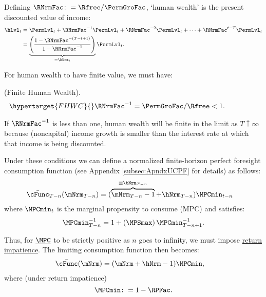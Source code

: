 \documentclass[BufferStockTheory]{subfiles}
\begin{document}
Defining $\RNrmFac \colon = \Rfree/\PermGroFac$, `human wealth' is the present discounted value of income:
%
% 
\begin{align}
  \hLvl_{t}  & = \PermLvl_{t}+\RNrmFac^{-1} \PermLvl_{t} + \RNrmFac^{-2} \PermLvl_{t} + \cdots + \RNrmFac^{t-T} \PermLvl_{t} \notag
  \\  & = \underbrace{\left(\frac{1-\RNrmFac^{-(T-t+1)}}{1-\RNrmFac^{-1}}\right)}_{\equiv \hNrm_{t}}\PermLvl_{t} \label{eq:HDef}.
\end{align}

For human wealth to have finite value, we must have:
%
\begin{assumI}\label{ass:FHWC}(Finite Human Wealth).
\begin{align}\hypertarget{FHWC}{}
   \RNrmFac^{-1} = \PermGroFac/\Rfree  & < 1. \phantom{\text{{\FHWC}:~~}}\label{eq:FHWC2}
\end{align}
\end{assumI}
%
If $\RNrmFac^{-1}$ is less than one, human wealth will be finite in the limit as $T \uparrow \infty$ because (noncapital) income growth is smaller than the interest rate at which that income is being discounted.

Under these conditions we can define a normalized finite-horizon perfect foresight consumption function (see Appendix \ref{subsec:ApndxUCPF} for details) as follows:\hypertarget{MPCminDefn}{}
%
%
\begin{align*}
  \bar{\cFunc}_{T-n}(\mNrm_{T-n})  & = (\overbrace{\mNrm_{T-n}-1}^{
                                     \equiv\bNrm_{T-n}}+\hNrm_{T-n})\MPCmin_{t-n}
\end{align*}
%
%
where $\MPCmin_{t}$ is the marginal propensity to consume (MPC) and satisfies:
%
\begin{align}\label{eq:MPCminInv}
\MPCmin_{T-n}^{-1}  = 1+\left(\MPSmax\right) \MPCmin_{T-n+1}^{-1}.
\end{align}
%

Thus, for $\underline{\MPC}$ to be strictly positive as $n$ goes to infinity, we must impose \hyperlink{RIC}{return impatience}. The limiting consumption function then becomes:
%
%
\begin{align}\label{eq:cFuncPFUnc}
  \bar{\cFunc}(\mNrm)  & = (\mNrm+\hNrm-1)\MPCmin,
\end{align}
%
where (under return impatience) 
%
%
\begin{equation}
\MPCmin \colon = 1-\RPFac.
\end{equation}
%
%
%
\end{document}
